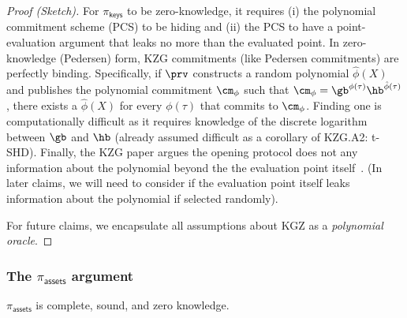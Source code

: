 \begin{proof}[Proof (Sketch)]
For $\pi_\mathsf{keys}$ to be zero-knowledge, it requires (i) the polynomial commitment scheme (PCS) to be hiding and (ii) the PCS to have a point-evaluation argument that leaks no more than the evaluated point. In zero-knowledge (Pedersen) form, KZG commitments (like Pedersen commitments) are perfectly binding. Specifically, if $\prv$ constructs a random polynomial $\hat\phi(X)$ and publishes the polynomial commitment $\cm_\phi$ such that $\cm_\phi=\gb^{\phi(\tau)}\hb^{\hat\phi(\tau)}$, there exists a $\hat\phi(X)$ for every $\phi(\tau)$ that commits to $\cm_\phi$. Finding one is computationally difficult as it requires knowledge of the discrete logarithm between $\gb$ and $\hb$ (already assumed difficult as a corollary of KZG.A2: t-SHD). Finally, the KZG paper argues the opening protocol does not any information about the polynomial beyond the the evaluation point itself~\cite{kzg}. (In later claims, we will need to consider if the evaluation point itself leaks information about the polynomial if selected randomly). 

For future claims, we encapsulate all assumptions about KGZ as a \textit{polynomial oracle}. \end{proof}


\subsubsection{The $\pi_\mathsf{assets}$ argument}

\begin{claim}\label{thm:assets} $\pi_\mathsf{assets}$ is complete, sound, and zero knowledge. \end{claim}


